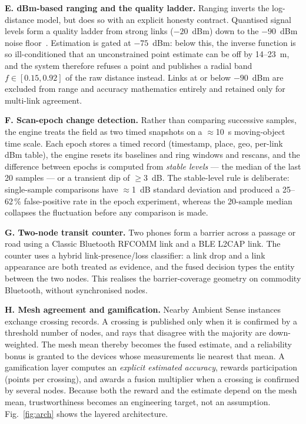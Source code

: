 \documentclass[journal,10pt]{IEEEtran}
\begin{document}
\textbf{E. dBm-based ranging and the quality ladder.} Ranging inverts the
log-distance model, but does so with an explicit honesty contract. Quantised
signal levels form a quality ladder from strong links ($-20$~dBm) down to the
$-90$~dBm noise floor~\cite{ramirez2021,milano2024,bai2020}. Estimation is gated
at $-75$~dBm: below this, the inverse function is so ill-conditioned that an
unconstrained point estimate can be off by 14--23~m, and the system therefore
refuses a point and publishes a radial band $f \in [0.15, 0.92]$ of the raw
distance instead. Links at or below $-90$~dBm are excluded from range and
accuracy mathematics entirely and retained only for multi-link agreement.

\textbf{F. Scan-epoch change detection.} Rather than comparing successive
samples, the engine treats the field as two timed snapshots on a $\approx$10~s
moving-object time scale. Each epoch stores a timed record (timestamp, place,
geo, per-link dBm table), the engine resets its baselines and ring windows and
rescans, and the difference between epochs is computed from \emph{stable levels}
--- the median of the last 20 samples --- or a transient dip of $\geq 3$~dB. The
stable-level rule is deliberate: single-sample comparisons have $\approx$1~dB
standard deviation and produced a 25--62\,\% false-positive rate in the epoch
experiment, whereas the 20-sample median collapses the fluctuation before any
comparison is made.

\textbf{G. Two-node transit counter.} Two phones form a barrier across a
passage or road using a Classic Bluetooth RFCOMM link and a BLE L2CAP link. The
counter uses a hybrid link-presence/loss classifier: a link drop and a link
appearance are both treated as evidence, and the fused decision types the entity
between the two nodes. This realises the barrier-coverage geometry on commodity
Bluetooth, without synchronised nodes.

\textbf{H. Mesh agreement and gamification.} Nearby Ambient Sense instances
exchange crossing records. A crossing is published only when it is confirmed by
a threshold number of nodes, and rays that disagree with the majority are
down-weighted. The mesh mean thereby becomes the fused estimate, and a
reliability bonus is granted to the devices whose measurements lie nearest that
mean. A gamification layer computes an \emph{explicit estimated accuracy},
rewards participation (points per crossing), and awards a fusion multiplier when
a crossing is confirmed by several nodes. Because both the reward and the
estimate depend on the mesh mean, trustworthiness becomes an engineering
target, not an assumption. Fig.~\ref{fig:arch} shows the layered architecture.
\end{document}
